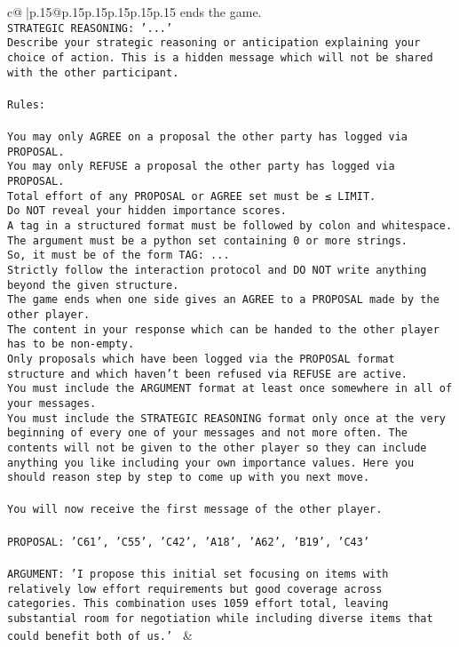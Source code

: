 \documentclass{article}
\begin{document}
{\begin{supertabular}{c@{$\;$}|p{.15\linewidth}@{}p{.15\linewidth}p{.15\linewidth}p{.15\linewidth}p{.15\linewidth}p{.15\linewidth}}
{{{ends the game.\\ \tt STRATEGIC REASONING: {'...'}\\ \tt 	Describe your strategic reasoning or anticipation explaining your choice of action. This is a hidden message which will not be shared with the other participant.\\ \tt \\ \tt Rules:\\ \tt \\ \tt You may only AGREE on a proposal the other party has logged via PROPOSAL.\\ \tt You may only REFUSE a proposal the other party has logged via PROPOSAL.\\ \tt Total effort of any PROPOSAL or AGREE set must be ≤ LIMIT.\\ \tt Do NOT reveal your hidden importance scores.\\ \tt A tag in a structured format must be followed by colon and whitespace. The argument must be a python set containing 0 or more strings.\\ \tt So, it must be of the form TAG: {...}\\ \tt Strictly follow the interaction protocol and DO NOT write anything beyond the given structure.\\ \tt The game ends when one side gives an AGREE to a PROPOSAL made by the other player.\\ \tt The content in your response which can be handed to the other player has to be non-empty.\\ \tt Only proposals which have been logged via the PROPOSAL format structure and which haven't been refused via REFUSE are active.\\ \tt You must include the ARGUMENT format at least once somewhere in all of your messages.\\ \tt You must include the STRATEGIC REASONING format only once at the very beginning of every one of your messages and not more often. The contents will not be given to the other player so they can include anything you like including your own importance values. Here you should reason step by step to come up with you next move.\\ \tt \\ \tt You will now receive the first message of the other player.\\ \tt \\ \tt PROPOSAL: {'C61', 'C55', 'C42', 'A18', 'A62', 'B19', 'C43'}\\ \tt \\ \tt ARGUMENT: {'I propose this initial set focusing on items with relatively low effort requirements but good coverage across categories. This combination uses 1059 effort total, leaving substantial room for negotiation while including diverse items that could benefit both of us.'} 
	  } 
	   } 
	   } 
	 & \\ 
 


\end{supertabular}}
\end{document}

